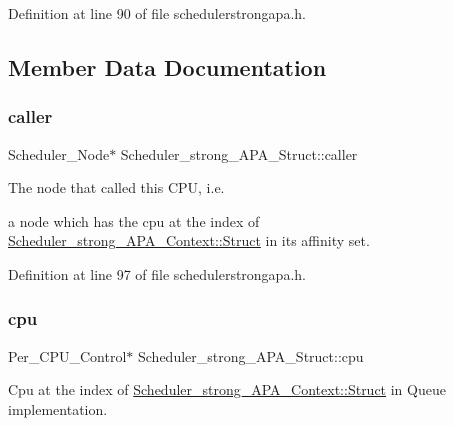 Definition at line 90 of file schedulerstrongapa.\+h.



\subsection{Member Data Documentation}
\mbox{\label{structScheduler__strong__APA__Struct_a9ab1e221dcee9eaebb131158da9a338e}} 
\subsubsection{\texorpdfstring{caller}{caller}}
{\footnotesize\ttfamily Scheduler\+\_\+\+Node$\ast$ Scheduler\+\_\+strong\+\_\+\+A\+P\+A\+\_\+\+Struct\+::caller}



The node that called this C\+PU, i.\+e. 

a node which has the cpu at the index of \hyperlink{structScheduler__strong__APA__Context_ac25debff84510636df8e42c5750ace15}{Scheduler\+\_\+strong\+\_\+\+A\+P\+A\+\_\+\+Context\+::\+Struct} in its affinity set. 

Definition at line 97 of file schedulerstrongapa.\+h.

\mbox{\label{structScheduler__strong__APA__Struct_a83534c31f08a040a5a24b48007f17a09}} 
\subsubsection{\texorpdfstring{cpu}{cpu}}
{\footnotesize\ttfamily Per\+\_\+\+C\+P\+U\+\_\+\+Control$\ast$ Scheduler\+\_\+strong\+\_\+\+A\+P\+A\+\_\+\+Struct\+::cpu}



Cpu at the index of \hyperlink{structScheduler__strong__APA__Context_ac25debff84510636df8e42c5750ace15}{Scheduler\+\_\+strong\+\_\+\+A\+P\+A\+\_\+\+Context\+::\+Struct} in Queue implementation. 



